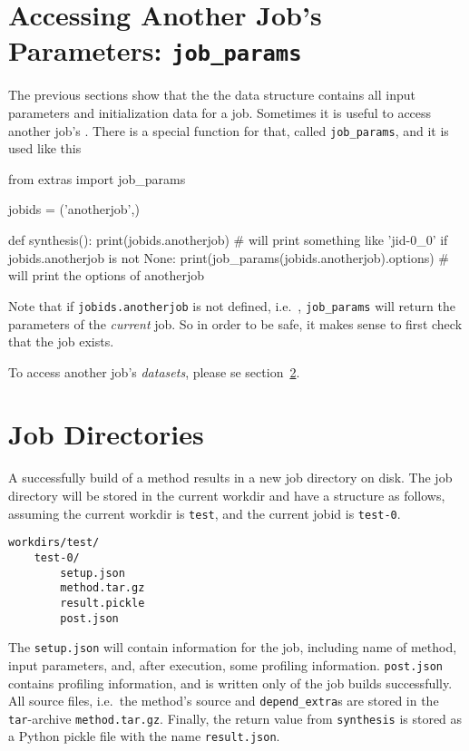 \stoptabletwo



\section{Accessing Another Job's Parameters:  \texttt{job\_params}}

The previous sections show that the the \params data structure
contains all input parameters and initialization data for a job.
Sometimes it is useful to access another job's \params.  There is a
special function for that, called \texttt{job\_params}, and it is used
like this
\begin{python}
from extras import job_params

jobids = ('anotherjob',)

def synthesis():
    print(jobids.anotherjob)
    # will print something like 'jid-0_0'
    if jobids.anotherjob is not None:
        print(job_params(jobids.anotherjob).options)
        # will print the options of anotherjob
\end{python}
Note that if \texttt{jobids.anotherjob} is not defined, i.e.\ \pyNone,
\texttt{job\_params} will return the parameters of the
\textsl{current} job.  So in order to be safe, it makes sense to first
check that the job exists.

To access another job's \textsl{datasets}, please se section~\ref{}.





\section{Job Directories}
A successfully build of a method results in a new job directory on
disk.  The job directory will be stored in the current workdir and
have a structure as follows, assuming the current workdir
is \texttt{test}, and the current jobid is \texttt{test-0}.
\begin{verbatim}
workdirs/test/
    test-0/
        setup.json
        method.tar.gz
        result.pickle
        post.json
\end{verbatim}
The \texttt{setup.json} will contain information for the job,
including name of method, input parameters, and, after execution, some
profiling information.  \texttt{post.json} contains profiling
information, and is written only of the job builds successfully.  All
source files, i.e.\ the method's source and \texttt{depend\_extra}s
are stored in the \texttt{tar}-archive \texttt{method.tar.gz}.
Finally, the return value from \texttt{synthesis} is stored as a
Python pickle file with the name \texttt{result.json}.

